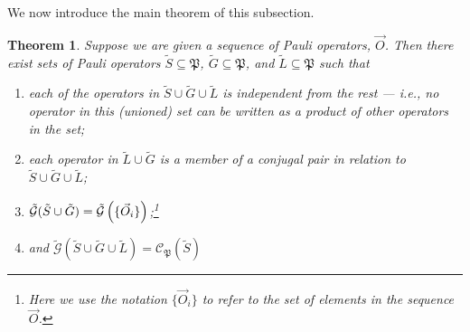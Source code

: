 \documentclass[twocolumn,showpacs,preprintnumbers,amsmath,amssymb,nofootinbib,pra,floatfix]{revtex4-1}
\newtheorem{theorem}{Theorem}
\newcommand{\lst}{\vec}
\newcommand{\set}{\tilde}
\newcommand{\genfun}{\tilde{\mathcal{G}}}
\newcommand{\pauligroup}{\mathfrak{P}}
\newcommand{\centralizer}{\mathcal{C}}
\begin{document}
We now introduce the main theorem of this subsection.

\begin{theorem} \label{theorem-SG} Suppose we are given a sequence of Pauli operators, $\lst O$.  Then there exist sets of Pauli operators $\set S\subseteq\pauligroup$, $\set G\subseteq\pauligroup$, and $\set L\subseteq\pauligroup$ such that
\begin{enumerate}
\item each of the operators in $\set S \cup \set G \cup \set L$ is independent from the rest --- i.e., no operator in this (unioned) set can be written as a product of other operators in the set;
\item each operator in $\set L \cup \set G$ is a member of a conjugal pair in relation to $\set S \cup \set G \cup \set L$;
\item $\genfun(\set S \cup \set G)=\genfun\paren{\{\lst O_i\}}$;\footnote{Here we use the notation $\{\vec{O}_i\}$ to refer to the set of elements in the sequence $\vec{O}$.}
\item and $\genfun(\set S \cup \set G \cup \set L)=\centralizer_\pauligroup(\set S)$
\end{enumerate}
\end{theorem}
\end{document}
